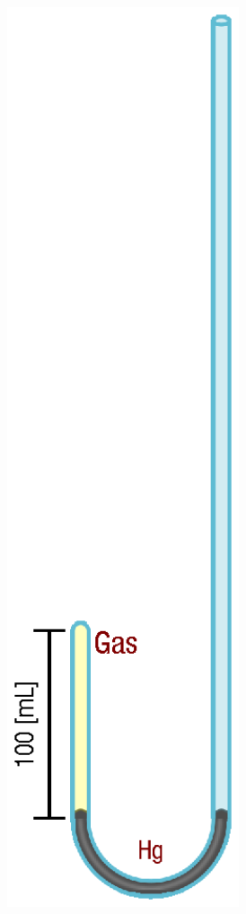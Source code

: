 \documentclass[letter,11pt]{article}
\begin{document}
\begin{figure}
\begin{subfigure}{.30\textwidth}
    \centering
    \includegraphics[width=0.75\textwidth]{resources/f1a.eps}

\end{subfigure}
\end{figure}
\end{document}
